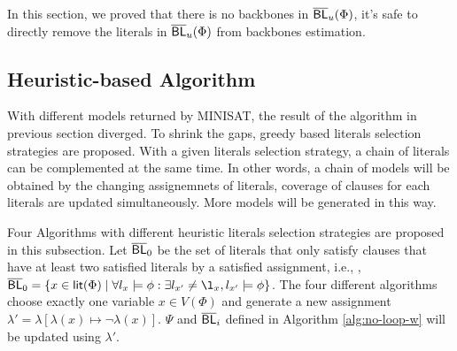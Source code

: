 In this section, we proved that there is no backbones in $\overline{\textsf{BL}}_u(\Phi)$, it's safe to directly remove the literals in $\overline{\textsf{BL}}_u(\Phi)$ from backbones estimation.


\subsection{Heuristic-based Algorithm}

With different models returned by MINISAT, the result of the algorithm in previous section diverged. To shrink the gaps, greedy based literals selection strategies are proposed. With a given literals selection strategy, a chain of literals can be complemented at the same time. In other words, a chain of models will be obtained by the changing assignemnets of literals, coverage of clauses for each literals are updated simultaneously. More models will be generated in this way.

Four Algorithms with different heuristic literals selection strategies are proposed in this subsection.
Let $\overline{\textsf{BL}}_0$ be the set of literals that only satisfy clauses that have at least two satisfied literals by a satisfied assignment,
i.e., , $\NBL_0=\{x\in\Lit(\Phi) \mid \forall l_x\models\phi: \exists l_{x'}\neq\l_x, l_{x'}\models\phi\}$.
The four different algorithms choose exactly one variable $x\in V(\Phi)$ and generate a new assignment
$\lambda'=\lambda[\lambda(x)\mapsto\neg\lambda(x)]$.
$\Psi$ and $\overline{\textsf{BL}}_i$ defined in Algorithm \ref{alg:no-loop-w} will be updated using $\lambda'$.


